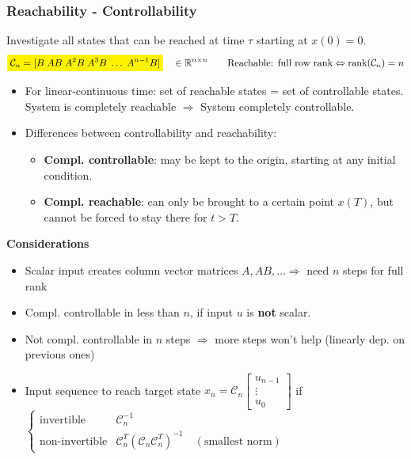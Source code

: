 \subsubsection{Reachability - Controllability}
Investigate all states that can be reached at time $\tau$ starting at $x(0)=0$.
\begin{equation*}
    \stabilo{\mathcal{C}_n = [B \; AB \; A^2B \; A^3B \; \ldots \; A^{n-1}B ]} \quad \in \mathbb{R}^{n \times n} \qquad \text{Reachable: full row rank} \Leftrightarrow \text{rank}(\mathcal{C}_n)=n 
\end{equation*}
\begin{itemize}
    \item For linear-continuous time: set of reachable states = set of controllable states. \\
    System is completely reachable $\Rightarrow$ System completely controllable. 
    \item Differences between controllability and reachability: 
    \begin{itemize}
        \item \textbf{Compl. controllable}: may be kept to the origin, starting at any initial condition.
        \item  \textbf{Compl. reachable}: can only be brought to a certain point $x(T)$, but cannot be forced to stay there for $t>T$.
    \end{itemize}
\end{itemize}
\textbf{Considerations}
\begin{itemize}
    \item Scalar input creates column vector matrices $A, AB,\ldots \Rightarrow$ need $n$ steps for full rank
    \item Compl. controllable in less than $n$, if input $u$ is \textbf{not} scalar.
    \item Not compl. controllable in $n$ steps $\Rightarrow$ more steps won't help (linearly dep. on previous ones)
    \item Input sequence to reach target state $x_n = \mathcal{C}_n\begin{bmatrix}
    u_{n-1} \\
    \vdots \\
    u_0
    \end{bmatrix}$ if $\begin{cases} 
        \text{invertible} &\mathcal{C}_n^{-1} \\ 
        \text{non-invertible} &\mathcal{C}_n^T(\mathcal{C}_n\mathcal{C}_n^T)^{-1} \quad (\text{smallest norm})
        \end{cases}$ 
\end{itemize}

